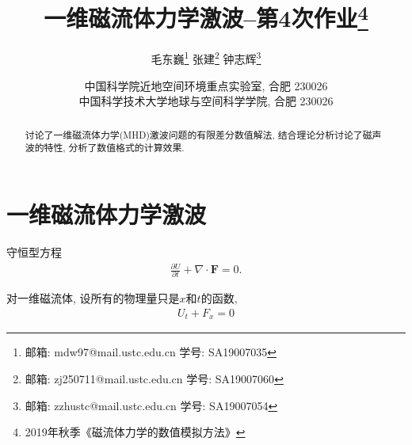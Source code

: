 \documentclass[10.5pt
]{article}
\begin{document}
\renewcommand{\refname}{参考文献}
\renewcommand{\figurename}{图}
\renewcommand{\abstractname}{摘要}

\title{一维磁流体力学激波--第4次作业\footnote{2019年秋季《磁流体力学的数值模拟方法》}}

\author{
	毛东巍\footnote{邮箱: mdw97@mail.ustc.edu.cn  学号: SA19007035}\quad 
	张建\footnote{邮箱: zj250711@mail.ustc.edu.cn  学号: SA19007060}\quad 
	钟志辉\footnote{邮箱: zzhustc@mail.ustc.edu.cn  学号: SA19007054}
}

\date{%
\scriptsize%
中国科学院近地空间环境重点实验室, 合肥 230026\\
中国科学技术大学地球与空间科学学院, 合肥 230026
%
}

\maketitle

\begin{abstract}
讨论了一维磁流体力学(MHD)激波问题的有限差分数值解法, 结合理论分析讨论了磁声波的特性,
分析了数值格式的计算效果.
\end{abstract}

\section{一维磁流体力学激波\citep{Jeffrey1964}}
守恒型方程
\begin{align}
\frac{\partial U}{\partial t} + \nabla \cdot \boldsymbol{F} = 0. \label{Eqn:3.1.6}
\end{align}

对一维磁流体, 设所有的物理量只是$x$和$t$的函数,
\begin{align}
U_t + F_x = 0\label{Eqn:6.1.1}
\end{align}
\end{document}
